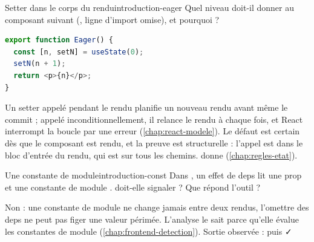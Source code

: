 \begin{exercice}{Setter dans le corps du rendu}{introduction-eager}
  Quel niveau \reactant{} doit-il donner au composant suivant
  (, ligne d'import omise), et pourquoi ?
\begin{lstlisting}[language=TypeScript]
export function Eager() {
  const [n, setN] = useState(0);
  setN(n + 1);
  return <p>{n}</p>;
}
\end{lstlisting}
\end{exercice}
\begin{solution}
  Un setter appelé pendant le rendu planifie un nouveau rendu avant même le
  commit ; appelé inconditionnellement, il relance le rendu à chaque fois, et
  React interrompt la boucle par une erreur (\cref{chap:react-modele}). Le
  défaut est certain dès que le composant est rendu, et la preuve est
  structurelle : l'appel est dans le bloc d'entrée du rendu, qui est sur tous
  les chemins. \reactant{} donne  (\cref{chap:regles-etat}).
\end{solution}

\begin{exercice}{Une constante de module}{introduction-const}
  Dans , un effet de deps \code{[page]} lit une
  prop  et une constante de module .
   doit-elle signaler  ? Que répond l'outil ?
\end{exercice}
\begin{solution}
  Non : une constante de module ne change jamais entre deux rendus, l'omettre
  des deps ne peut pas figer une valeur périmée. L'analyse le sait parce
  qu'elle évalue les constantes de module (\cref{chap:frontend-detection}).
  Sortie observée :  puis
  ✓~
\end{solution}

